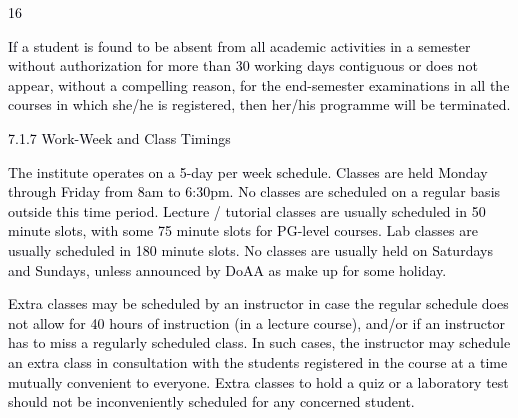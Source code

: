 \documentclass[12pt]{article}
\begin{document}
\vspace{\baselineskip}

\vspace{\baselineskip}

\vspace{\baselineskip}

\vspace{\baselineskip}
\begin{Center}
\textcolor[HTML]{00000A}{16}
\end{Center}\par


\vspace{\baselineskip}
\begin{justify}
{\fontsize{10pt}{12.0pt}\selectfont \textcolor[HTML]{00000A}{If a student is found to be absent from all academic activities in a semester without authorization for more than 30 working days contiguous or does not appear, without a compelling reason, for the end-semester examinations in all the courses in which she/he is registered, then her/his programme will be terminated.}\par}
\end{justify}\par


\vspace{\baselineskip}
{\fontsize{10pt}{12.0pt}\selectfont \textcolor[HTML]{00000A}{7.1.7 Work-Week and Class Timings}\par}\par


\vspace{\baselineskip}
\begin{justify}
{\fontsize{9pt}{10.8pt}\selectfont \textcolor[HTML]{00000A}{The institute operates on a 5-day per week schedule. Classes are held Monday through Friday from 8am to 6:30pm. No classes are scheduled on a regular basis outside this time period. Lecture / tutorial classes are usually scheduled in 50 minute slots, with some 75 minute slots for PG-level courses. Lab classes are usually scheduled in 180 minute slots. No classes are usually held on Saturdays and Sundays, unless announced by DoAA as make up for some holiday.}\par}
\end{justify}\par


\vspace{\baselineskip}
\begin{adjustwidth}{0.0in}{0.04in}
{\fontsize{9pt}{10.8pt}\selectfont \textcolor[HTML]{00000A}{Extra classes may be scheduled by an instructor in case the regular schedule does not allow for 40 hours of instruction (in a lecture course), and/or if an instructor has to miss a regularly scheduled class. In such cases, the instructor may schedule an extra class in consultation with the students registered in the course at a time mutually convenient to everyone. Extra classes to hold a quiz or a laboratory test should not be inconveniently scheduled for any concerned student.}\par}\par

\end{adjustwidth}
\end{document}
